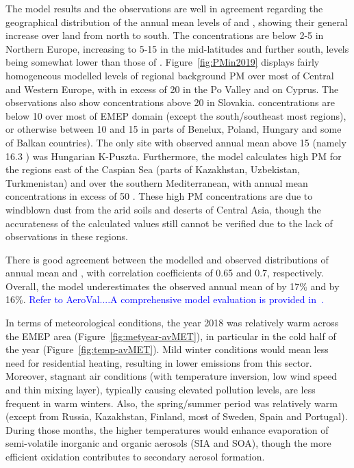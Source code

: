 The model results and the observations are well in agreement
regarding the geographical distribution of the annual mean levels of
\PM[10] and \PM[2.5], showing their general increase over land from
north to south. The concentrations are below 2-5 \ug in Northern
Europe, increasing to 5-15 \ug in the mid-latitudes and further south,
\PM[2.5] levels being somewhat lower than those of
\PM[10]. Figure~\ref{fig:PMin2019} displays fairly homogeneous modelled levels of regional background PM over most of Central and Western Europe,
with \PM[10] in excess of 20 \ug in the Po Valley and on Cyprus. The observations also show \PM[10] concentrations above 20 \ug in Slovakia. \PM[2.5] concentrations are below 10 \ug over most of EMEP domain (except the south/southeast most regions), or otherwise between 10 and 15 \ug in  parts of Benelux, Poland, Hungary and some of Balkan countries). The only site with observed annual mean \PM[10] above 15 \ug (namely 16.3 \ug) was Hungarian K-Puszta. Furthermore, the model calculates high PM for the regions east of the Caspian Sea (parts of Kazakhstan, Uzbekistan, Turkmenistan) and over the southern Mediterranean, with annual mean concentrations in excess of 50 \ug. These high PM concentrations are due to windblown dust from the arid soils and deserts of Central Asia, though the accurateness of the calculated values still cannot be verified due to the lack of observations in these regions.

There is good agreement between the modelled and observed
distributions of annual mean \PM[10] and \PM[2.5], with correlation
coefficients of 0.65 and 0.7, respectively. Overall, the model
underestimates the observed annual mean of \PM[10] by 17\% and
\PM[2.5] by 16\%. \textcolor{blue}{Refer to AeroVal....A comprehensive model evaluation is provided in~\cite{WEB2020:PM}.}

In terms of meteorological conditions, the year 2018 was relatively warm across the EMEP area (Figure~\ref{fig:metyear-avMET}), in particular in the cold half of the year (Figure~\ref{fig:temp-avMET}). Mild winter conditions would mean less need for residential heating, resulting in lower emissions from this sector. Moreover, stagnant air conditions (with temperature inversion, low wind speed and thin mixing layer), typically causing elevated pollution levels, are less frequent in warm winters. Also, the spring/summer period was relatively warm (except from Russia, Kazakhstan, Finland, most of Sweden, Spain and Portugal). During those months, the higher temperatures would enhance evaporation of semi-volatile inorganic and organic aerosols (SIA and SOA), though the more efficient oxidation contributes to secondary aerosol formation.

